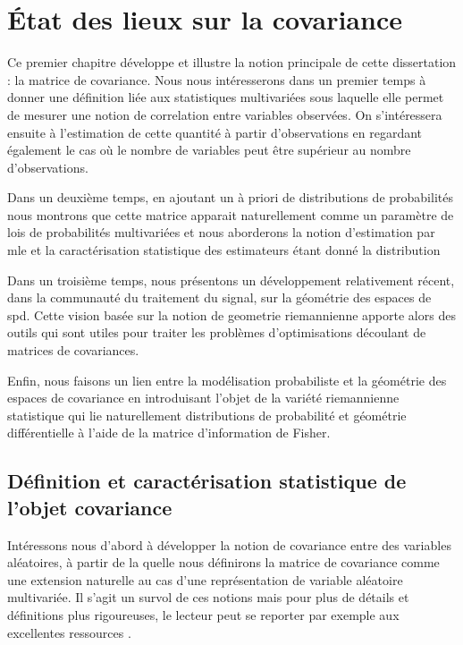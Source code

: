 \chapter{\'Etat des lieux sur la covariance}
\label{ch:context}


Ce premier chapitre développe et illustre la notion principale de cette dissertation : la matrice de covariance. Nous nous intéresserons dans un premier temps à donner une définition liée aux statistiques multivariées sous laquelle elle permet de mesurer une notion de correlation entre variables observées. On s'intéressera ensuite à l'estimation de cette quantité à partir d'observations en regardant également le cas où le nombre de variables peut être supérieur au nombre d'observations.

Dans un deuxième temps, en ajoutant un à priori de distributions de probabilités nous montrons que cette matrice apparait naturellement comme un paramètre de lois de probabilités multivariées et nous aborderons la notion d'estimation par mle et la caractérisation statistique des estimateurs étant donné la distribution

Dans un troisième temps, nous présentons un développement relativement récent, dans la communauté du traitement du signal, sur la géométrie des espaces de spd. Cette vision basée sur la notion de geometrie riemannienne apporte alors des outils qui sont utiles pour traiter les problèmes d'optimisations découlant de matrices de covariances.

Enfin, nous faisons un lien entre la modélisation probabiliste et la géométrie des espaces de covariance en introduisant l'objet de la variété riemannienne statistique qui lie naturellement distributions de probabilité et géométrie différentielle à l'aide de la matrice d'information de Fisher.

\section{Définition et caractérisation statistique de l'objet covariance}
\label{sec:context-definition-caracterisation}

Intéressons nous d'abord à développer la notion de covariance entre des variables aléatoires, à partir de la quelle nous définirons la matrice de covariance comme une extension naturelle au cas d'une représentation de variable aléatoire multivariée. Il s'agit un survol de ces notions mais pour plus de détails et définitions plus rigoureuses, le lecteur peut se reporter par exemple aux excellentes ressources .


